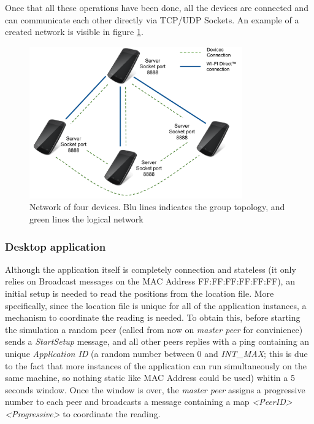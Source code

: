Once that all these operations have been done, all the devices are connected and can communicate each other directly via TCP/UDP Sockets. An example of a created network is visible in figure \ref{fig:device_network}.

\begin{figure}[!htbp]
\centering
\includegraphics[width=3.6in]{imgs/Devices_network.pdf}
\caption{Network of four devices. Blu lines indicates the \direct group topology, and green lines the logical network}
\label{fig:device_network}
\end{figure}

\subsubsection{Desktop application}
Although the application itself is completely connection and stateless (it only relies on Broadcast messages on the MAC Address FF:FF:FF:FF:FF:FF), an initial setup is needed to read the positions from the location file. More specifically, since the location file is unique for all of the application instances, a mechanism to coordinate the reading is needed. To obtain this, before starting the simulation a random peer (called from now on \textit{master peer} for convinience) sends a \textit{StartSetup} message, and all other peers replies with a ping containing an unique \textit{Application ID} (a random number between 0 and \textit{INT\_MAX}; this is due to the fact that more instances of the application can run simultaneously on  the same machine, so nothing static like MAC Address could be used) whitin a 5 seconds window. Once the window is over, the \textit{master peer} assigns a progressive number to each peer and broadcasts a message containing a map \textit{\textless PeerID\textgreater\textless Progressive\textgreater} to coordinate the reading.
